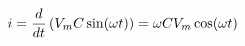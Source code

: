 \documentclass[preview]{standalone}
\begin{document}
\begin{align*}
i  = {d \over dt} \left( V_m C \sin(\omega t) \right)  =  \omega C V_m \cos(\omega t)
\end{align*}
\end{document}
